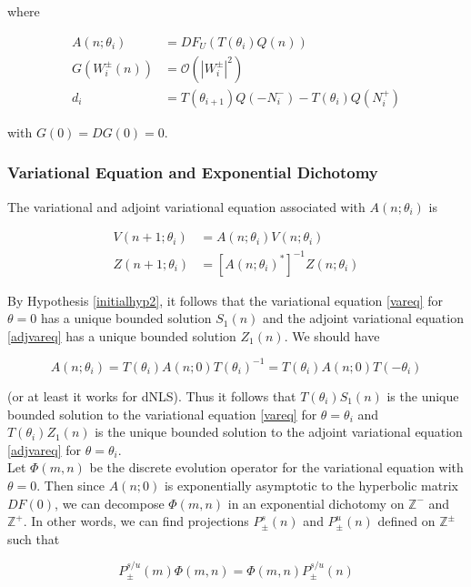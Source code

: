 \documentclass[12pt]{article}
\def\Z{{\mathbb Z}}
\begin{document}
where

\begin{align*}
A(n; \theta_i) &= DF_{U}( T(\theta_i) Q(n)) \\
G(W_i^\pm(n)) &= \mathcal{O}(|W_i^\pm|^2) \\
d_i &= T(\theta_{i+1}) Q(-N_i^-) - T(\theta_i) Q(N_i^+)
\end{align*}

with $G(0) = DG(0) = 0$.\\

\subsubsection{Variational Equation and Exponential Dichotomy}

The variational and adjoint variational equation associated with $A(n; \theta_i)$ is

\begin{align}
V(n+1; \theta_i) &= A(n; \theta_i) V(n; \theta_i) \label{vareq} \\
Z(n+1; \theta_i) &= [A(n; \theta_i)^*]^{-1} Z(n; \theta_i) \label{adjvareq} 
\end{align}

By Hypothesis \ref{initialhyp2}, it follows that the variational equation \eqref{vareq} for $\theta = 0$ has a unique bounded solution $S_1(n)$ and the adjoint variational equation \eqref{adjvareq} has a unique bounded solution $Z_1(n)$. We should have 

\[
A(n; \theta_i) = T(\theta_i)A(n; 0)T(\theta_i)^{-1} = T(\theta_i)A(n; 0)T(-\theta_i)
\]

(or at least it works for dNLS). Thus it follows that $T(\theta_i) S_1(n)$ is the unique bounded solution to the variational equation \eqref{vareq} for $\theta = \theta_i$ and $T(\theta_i) Z_1(n)$ is the unique bounded solution to the adjoint variational equation \eqref{adjvareq} for $\theta = \theta_i$.\\

Let $\Phi(m, n)$ be the discrete evolution operator for the variational equation with $\theta = 0$. Then since $A(n; 0)$ is exponentially asymptotic to the hyperbolic matrix $DF(0)$, we can decompose $\Phi(m, n)$ in an exponential dichotomy on $\Z^-$ and $\Z^+$. In other words, we can find projections $P_\pm^s(n)$ and $P_\pm^u(n)$ defined on $\Z^\pm$ such that

\begin{equation}\label{projcommute}
P_\pm^{s/u}(m) \Phi(m, n) =  \Phi(m, n) P_\pm^{s/u}(n)
\end{equation}
\end{document}

